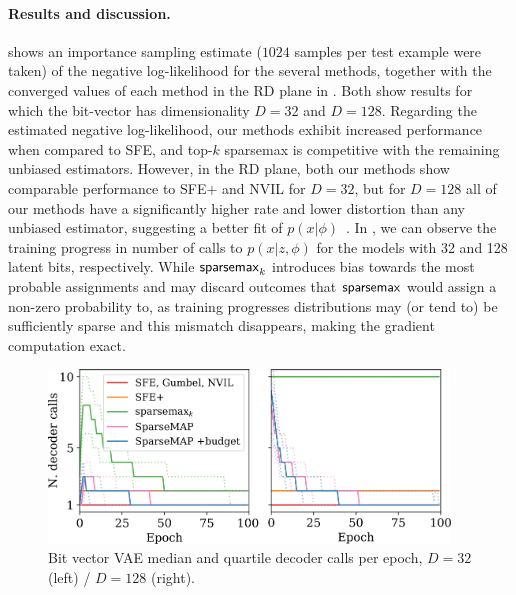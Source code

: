 \paragraph*{Results and discussion.} 
shows an importance sampling estimate ($1024$ samples per test
example were taken) of the negative log-likelihood for the several
methods, together with the converged values of each method in the RD
plane in . Both show results for which the
bit-vector has dimensionality $D=32$ and $D=128$. Regarding the
estimated negative log-likelihood, our methods exhibit increased
performance when compared to SFE, and top-$k$ sparsemax is
competitive with the remaining unbiased estimators. However, in the
RD plane, both our methods show comparable performance to SFE$+$ and
NVIL for $D=32$, but for $D=128$ all of our methods have a
significantly higher rate and lower distortion than any unbiased
estimator, suggesting a better fit of $p(x|\phi)$~\citep{Alemi2018}.
In , we can observe the training progress in
number of calls to $p(x |z, \phi)$ for the models with 32 and 128
latent bits, respectively. While $\operatorname{\mathsf{sparsemax}_\text{$k$}}$ introduces bias
towards the most probable assignments and may discard outcomes that
$\operatorname*{\mathsf{sparsemax}}$ would assign a non-zero probability to, as training
progresses distributions may (or tend to) be sufficiently sparse and
this mismatch disappears, making the gradient computation exact.

\begin{figure}[htbp]
    \centering
    \includegraphics[width=0.95\textwidth]{Figures/spars.pdf}
    \caption[Bit vector VAE median and quartile decoder calls per
        epoch.]{Bit vector VAE median and quartile decoder calls per
        epoch,
        $D=32$ (left) / $D=128$ (right).\label{fig:structcalls}}
\end{figure}

